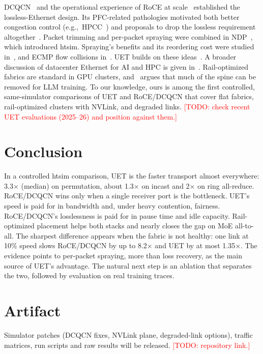\documentclass[conference]{IEEEtran}
\newcommand{\todo}[1]{\textcolor{red}{[TODO: #1]}}
\begin{document}
DCQCN~\cite{dcqcn} and the operational experience of RoCE at
scale~\cite{rdma-scale} established the lossless-Ethernet design. Its
PFC-related pathologies motivated both better congestion control
(e.g.,~HPCC~\cite{hpcc}) and proposals to drop the lossless requirement
altogether~\cite{irn}. Packet trimming and per-packet spraying were combined in
NDP~\cite{ndp}, which introduced htsim. Spraying's benefits and its reordering
cost were studied in~\cite{spray}, and ECMP flow collisions in~\cite{hedera}.
UET builds on these ideas~\cite{uec-spec,uec-design,reps}. A broader
discussion of datacenter Ethernet for AI and HPC is given
in~\cite{hoefler-ethernet}. Rail-optimized fabrics are standard in GPU
clusters, and~\cite{railonly} argues that much of the spine can be removed for
LLM training. To our knowledge, ours is among the first controlled,
same-simulator comparisons of UET and RoCE/DCQCN that cover flat fabrics,
rail-optimized clusters with NVLink, and degraded links.
\todo{check recent UET evaluations (2025--26) and position against them.}

\section{Conclusion}

In a controlled htsim comparison, UET is the faster transport almost everywhere:
3.3$\times$ (median) on permutation, about 1.3$\times$ on incast and 2$\times$ on
ring all-reduce. RoCE/DCQCN wins only when a single receiver port is the
bottleneck. UET's speed is paid for in bandwidth and, under heavy contention,
fairness. RoCE/DCQCN's losslessness is paid for in pause time and idle capacity.
Rail-optimized placement helps both stacks and nearly closes the gap on MoE
all-to-all. The sharpest difference appears when the fabric is not healthy:
one link at 10\% speed slows RoCE/DCQCN by up to 8.2$\times$ and UET by at most
1.35$\times$. The evidence points to per-packet spraying, more than loss
recovery, as the main source of UET's advantage. The natural next step is an
ablation that separates the two, followed by evaluation on real training traces.

\section*{Artifact}
Simulator patches (DCQCN fixes, NVLink plane, degraded-link options), traffic
matrices, run scripts and raw results will be released. \todo{repository link.}



\end{document}
